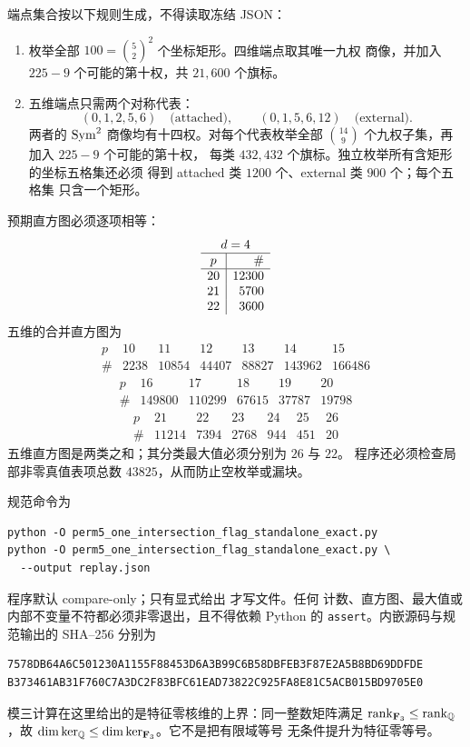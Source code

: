 端点集合按以下规则生成，不得读取冻结 JSON：
\begin{enumerate}[label=(\arabic*)]
\item 枚举全部 \(100=\binom52^2\) 个坐标矩形。四维端点取其唯一九权
商像，并加入 \(225-9\) 个可能的第十权，共 \(21{,}600\) 个旗标。
\item 五维端点只需两个对称代表：
\[
 (0,1,2,5,6)\quad\text{(attached)},\qquad
 (0,1,5,6,12)\quad\text{(external)}.
\]
两者的 \(\operatorname{Sym}^2\) 商像均有十四权。对每个代表枚举全部
\(\binom{14}{9}\) 个九权子集，再加入 \(225-9\) 个可能的第十权，
每类 \(432{,}432\) 个旗标。独立枚举所有含矩形的坐标五格集还必须
得到 attached 类 \(1200\) 个、external 类 \(900\) 个；每个五格集
只含一个矩形。
\end{enumerate}

预期直方图必须逐项相等：
\[
\begin{array}{c|r}
\multicolumn{2}{c}{d=4}\\ \hline
p&\#\\ \hline
20&12300\\21&5700\\22&3600
\end{array}
\]
五维的合并直方图为
\[
\begin{array}{c|rrrrrr}
p&10&11&12&13&14&15\\ \hline
\#&2238&10854&44407&88827&143962&166486
\end{array}
\]
\[
\begin{array}{c|rrrrr}
p&16&17&18&19&20\\ \hline
\#&149800&110299&67615&37787&19798
\end{array}
\]
\[
\begin{array}{c|rrrrrr}
p&21&22&23&24&25&26\\ \hline
\#&11214&7394&2768&944&451&20
\end{array}
\]
五维直方图是两类之和；其分类最大值必须分别为 \(26\) 与 \(22\)。
程序还必须检查局部非零真值表项总数 \(43825\)，从而防止空枚举或漏块。

规范命令为
\begin{verbatim}
python -O perm5_one_intersection_flag_standalone_exact.py
python -O perm5_one_intersection_flag_standalone_exact.py \
  --output replay.json
\end{verbatim}
程序默认 compare-only；只有显式给出  才写文件。任何
计数、直方图、最大值或内部不变量不符都必须非零退出，且不得依赖
Python 的 \texttt{assert}。内嵌源码与规范输出的 SHA--256 分别为
\begin{verbatim}
7578DB64A6C501230A1155F88453D6A3B99C6B58DBFEB3F87E2A5B8BD69DDFDE
B373461AB31F760C7A3DC2F83BFC61EAD73822C925FA8E81C5ACB015BD9705E0
\end{verbatim}
模三计算在这里给出的是特征零核维的上界：同一整数矩阵满足
\(\operatorname{rank}_{\mathbf F_3}\le\operatorname{rank}_{\mathbb Q}\)，故
\(\dim\ker_{\mathbb Q}\le\dim\ker_{\mathbf F_3}\)。它不是把有限域等号
无条件提升为特征零等号。

